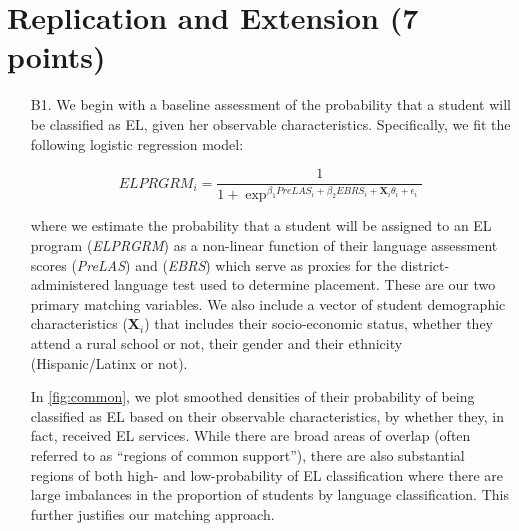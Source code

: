 \documentclass[a4paper, 11pt]{article}
\begin{document}
\begin{enumerate}


\end{enumerate}
\pagebreak

\section{Replication and Extension (7 points)}

\begin{enumerate}
	\item[B1.] We begin with a baseline assessment of the probability that a student will be classified as EL, given her observable characteristics. Specifically, we fit the following logistic regression model:

\begin{equation}
	ELPRGRM_{i}= \frac{1}{1+\exp^{\beta_{1}PreLAS_{i} + \beta_{2}EBRS_{i} + \textbf{X}_i\theta_{i} + \epsilon_{i}}}
\end{equation}


	where we estimate the probability that a student will be assigned to an EL program (\textit{ELPRGRM}) as a non-linear function of their language assessment scores (\textit{PreLAS}) and (\textit{EBRS}) which serve as proxies for the district-administered language test used to determine placement. These are our two primary matching variables. We also include a vector of student demographic characteristics (\textbf{X$_{i}$}) that includes their socio-economic status, whether they attend a rural school or not, their gender and their ethnicity (Hispanic/Latinx or not). 

	In \autoref{fig:common}, we plot smoothed densities of their probability of being classified as EL based on their observable characteristics, by whether they, in fact, received EL services. While there are broad areas of overlap (often referred to as ``regions of common support''), there are also substantial regions of both high- and low-probability of EL classification where there are large imbalances in the proportion of students by language classification. This further justifies our matching approach.


\end{enumerate}
\end{document}
